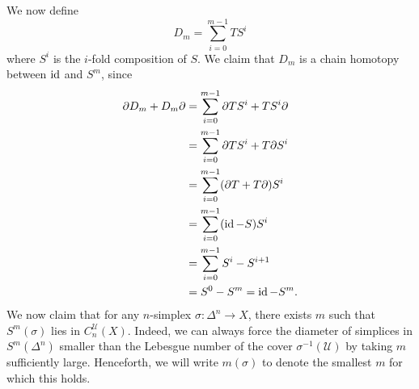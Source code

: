 \documentclass{article}
\begin{document}
\noindent{}We now define%
\noindent\noindent\[%
D_m = \sum_{i=0}^{m-1} TS^i
\]%
\noindent{}where $S^i$ is the $i$-fold composition of $S$. We claim that $D_m$ is a chain homotopy between $\operatorname{id}$ and $S^m$, since
\noindent\noindent\[%
\begin{aligned}
\partial D_m + D_m \partial &= \sum_{i=0}^{m-1} \partial TS^i + TS^i \partial \\
&= \sum_{i=0}^{m-1} \partial TS^i + T\partial S^i \\
&= \sum_{i=0}^{m-1} (\partial T + T\partial) S^i \\
&= \sum_{i=0}^{m-1} (\id - S) S^i \\
&= \sum_{i=0}^{m-1} S^i - S^{i+1} \\
&= S^0 - S^m = \id - S^m.
\end{aligned}
\]%
\noindent{}We now claim that for any $n$-simplex $\sigma: \Delta^n \to X$, there exists $m$ such that $S^m(\sigma)$ lies in $C_n^\mathcal{U}(X)$. Indeed, we can always force the diameter of simplices in $S^m(\Delta^n)$ smaller than the Lebesgue number of the cover $\sigma^{-1}(\mathcal{U})$ by taking $m$ sufficiently large. Henceforth, we will write $m(\sigma)$ to denote the smallest $m$ for which this holds.
\end{document}
